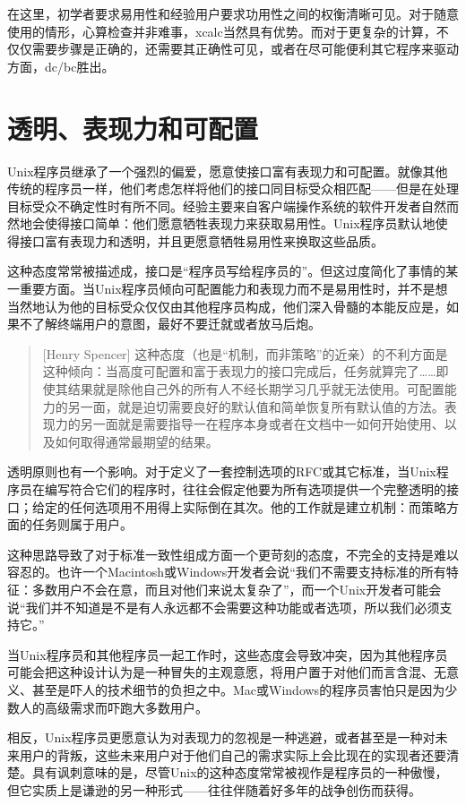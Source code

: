 \documentclass[12pt,oneside]{book}
\begin{document}
在这里，初学者要求易用性和经验用户要求功用性之间的权衡清晰可见。对于随意使用的情形，心算检查并非难事，xcalc当然具有优势。而对于更复杂的计算，不仅仅需要步骤是正确的，还需要其正确性可见，或者在尽可能便利其它程序来驱动方面，dc/bc胜出。

\section{透明、表现力和可配置}
Unix程序员继承了一个强烈的偏爱，愿意使接口富有表现力和可配置。就像其他传统的程序员一样，他们考虑怎样将他们的接口同目标受众相匹配——但是在处理目标受众不确定性时有所不同。经验主要来自客户端操作系统的软件开发者自然而然地会使得接口简单：他们愿意牺牲表现力来获取易用性。Unix程序员默认地使得接口富有表现力和透明，并且更愿意牺牲易用性来换取这些品质。

这种态度常常被描述成，接口是“程序员写给程序员的”。但这过度简化了事情的某一重要方面。当Unix程序员倾向可配置能力和表现力而不是易用性时，并不是想当然地认为他的目标受众仅仅由其他程序员构成，他们深入骨髓的本能反应是，如果不了解终端用户的意图，最好不要迁就或者放马后炮。

\begin{quote}[Henry Spencer]
这种态度（也是“机制，而非策略”的近亲）的不利方面是这种倾向：当高度可配置和富于表现力的接口完成后，任务就算完了……即使其结果就是除他自己外的所有人不经长期学习几乎就无法使用。可配置能力的另一面，就是迫切需要良好的默认值和简单恢复所有默认值的方法。表现力的另一面就是需要指导一在程序本身或者在文档中一如何开始使用、以及如何取得通常最期望的结果。
\end{quote}

透明原则也有一个影响。对于定义了一套控制选项的RFC或其它标准，当Unix程序员在编写符合它们的程序时，往往会假定他要为所有选项提供一个完整透明的接口；给定的任何选项用不用得上实际倒在其次。他的工作就是建立机制：而策略方面的任务则属于用户。

这种思路导致了对于标准一致性组成方面一个更苛刻的态度，不完全的支持是难以容忍的。也许一个Macintosh或Windows开发者会说“我们不需要支持标准的所有特征：多数用户不会在意，而且对他们来说太复杂了”，而一个Unix开发者可能会说“我们并不知道是不是有人永远都不会需要这种功能或者选项，所以我们必须支持它。”

当Unix程序员和其他程序员一起工作时，这些态度会导致冲突，因为其他程序员可能会把这种设计认为是一种冒失的主观意愿，将用户置于对他们而言含混、无意义、甚至是吓人的技术细节的负担之中。Mac或Windows的程序员害怕只是因为少数人的高级需求而吓跑大多数用户。

相反，Unix程序员更愿意认为对表现力的忽视是一种逃避，或者甚至是一种对未来用户的背叛，这些未来用户对于他们自己的需求实际上会比现在的实现者还要清楚。具有讽刺意味的是，尽管Unix的这种态度常常被视作是程序员的一种傲慢，但它实质上是谦逊的另一种形式——往往伴随着好多年的战争创伤而获得。
\end{document}
